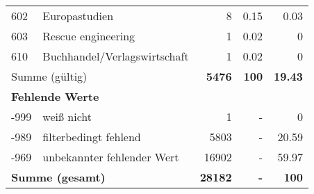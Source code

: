 \begin{longtable}{lXrrr}
        602 & \multicolumn{1}{X}{Europastudien} & %
          \num{8} &
          \num[round-mode=places,round-precision=2]{0,15} &
          \num[round-mode=places,round-precision=2]{0,03} \\

        603 & \multicolumn{1}{X}{Rescue engineering} & %
          \num{1} &
          \num[round-mode=places,round-precision=2]{0,02} &
          \num[round-mode=places,round-precision=2]{0} \\

        610 & \multicolumn{1}{X}{Buchhandel/Verlagswirtschaft} & %
          \num{1} &
          \num[round-mode=places,round-precision=2]{0,02} &
          \num[round-mode=places,round-precision=2]{0} \\

     \midrule
     \multicolumn{2}{l}{Summe (gültig)} &
       \textbf{\num{5476}} &
     \textbf{100} &
       \textbf{\num[round-mode=places,round-precision=2]{19,43}} \\
     \multicolumn{5}{l}{\textbf{Fehlende Werte}}\\
       -999 &
       weiß nicht &
         \num{1} &
        - &
         \num[round-mode=places,round-precision=2]{0} \\
       -989 &
       filterbedingt fehlend &
         \num{5803} &
        - &
         \num[round-mode=places,round-precision=2]{20,59} \\
       -969 &
       unbekannter fehlender Wert &
         \num{16902} &
        - &
         \num[round-mode=places,round-precision=2]{59,97} \\
     \midrule
     \multicolumn{2}{l}{\textbf{Summe (gesamt)}} &
          \textbf{\num{28182}} &
        \textbf{-} &
        \textbf{100} \\
     \bottomrule
     \end{longtable}
     
